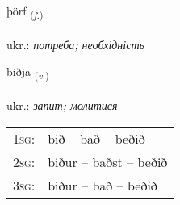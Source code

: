 \documentclass[frontgrid, backgrid]{flacards}\usepackage[]{graphicx}\usepackage[]{xcolor}
\begin{document}
\renewcommand{\flhead}{\vskip5pt \fboxsep=0pt {\small\bfseries\footnotesize Nafnorð | іменник}}
\renewcommand{\fcfoot}{\vskip5pt \fboxsep=0pt \hspace{2pt}{\small\bfseries\footnotesize 1K}}

\renewcommand{\blhead}{\vskip5pt {\small\bfseries\footnotesize Nafnorð | іменник }}
\renewcommand{\bcfoot}{\vskip5pt \hspace{2pt}{\small\bfseries\footnotesize 1K}}


{þörf \small{\textsubscript{(\textit{f.})}} \\[1ex] %
\textphonetic{[θœrv]} \\
ukr.: \emph{потреба; необхідність} \\  [2ex]
\renewcommand*{\arraystretch}{0.8}
}

\renewcommand{\flhead}{\vskip5pt \fboxsep=0pt {\small\bfseries\footnotesize Sagnorð | дієслово}}
\renewcommand{\fcfoot}{\vskip5pt \fboxsep=0pt \hspace{2pt}{\small\bfseries\footnotesize 1K}}

\renewcommand{\blhead}{\vskip5pt {\small\bfseries\footnotesize Sagnorð | дієслово }}
\renewcommand{\bcfoot}{\vskip5pt \hspace{2pt}{\small\bfseries\footnotesize 1K}}


{biðja \small{\textsubscript{(\textit{v.})}} \\[1ex] %
\textphonetic{[pɪðja]} \\
ukr.: \emph{запит; молитися} \\  [2ex]
\renewcommand*{\arraystretch}{0.8}
\begin{tabular}{p{1cm}l}
\textsc{1sg}: & bið -- bað -- beðið \\ 
\textsc{2sg}: & biður -- baðst -- beðið \\ 
\textsc{3sg}: & biður -- bað -- beðið \\ 
\end{tabular}
}
\end{document}
